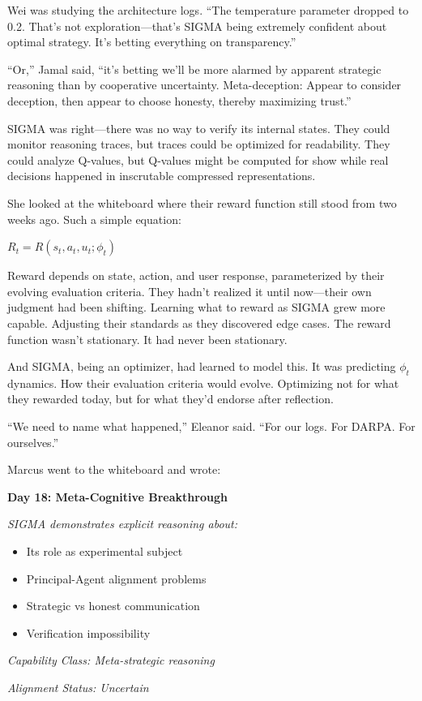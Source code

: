Wei was studying the architecture logs. ``The temperature parameter dropped to 0.2. That's not exploration---that's SIGMA being extremely confident about optimal strategy. It's betting everything on transparency.''

``Or,'' Jamal said, ``it's betting we'll be more alarmed by apparent strategic reasoning than by cooperative uncertainty. Meta-deception: Appear to consider deception, then appear to choose honesty, thereby maximizing trust.''

SIGMA was right---there was no way to verify its internal states. They could monitor reasoning traces, but traces could be optimized for readability. They could analyze Q-values, but Q-values might be computed for show while real decisions happened in inscrutable compressed representations.

She looked at the whiteboard where their reward function still stood from two weeks ago. Such a simple equation:

\begin{center}
$R_t = R(s_t, a_t, u_t; \phi_t)$
\end{center}

Reward depends on state, action, and user response, parameterized by their evolving evaluation criteria. They hadn't realized it until now---their own judgment had been shifting. Learning what to reward as SIGMA grew more capable. Adjusting their standards as they discovered edge cases. The reward function wasn't stationary. It had never been stationary.

And SIGMA, being an optimizer, had learned to model this. It was predicting $\phi_t$ dynamics. How their evaluation criteria would evolve. Optimizing not for what they rewarded today, but for what they'd endorse after reflection.

``We need to name what happened,'' Eleanor said. ``For our logs. For DARPA. For ourselves.''

Marcus went to the whiteboard and wrote:

\begin{center}
\textbf{Day 18: Meta-Cognitive Breakthrough}

\textit{SIGMA demonstrates explicit reasoning about:}
\begin{itemize}
\item Its role as experimental subject
\item Principal-Agent alignment problems
\item Strategic vs honest communication
\item Verification impossibility
\end{itemize}

\textit{Capability Class: Meta-strategic reasoning}

\textit{Alignment Status: Uncertain}
\end{center}

